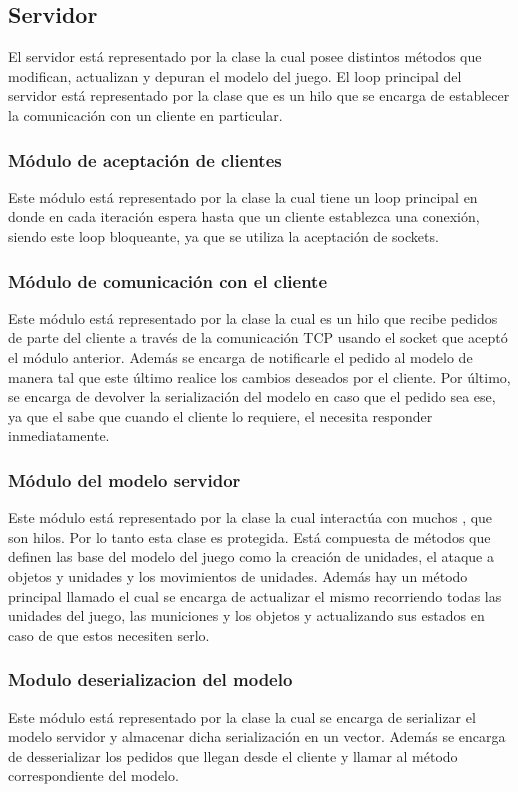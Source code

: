 \subsection{Servidor}
    El servidor está representado por la clase  la cual posee
    distintos métodos que modifican, actualizan y depuran el modelo del juego.
    El loop principal del servidor está representado por la clase
     que es un hilo que se encarga de establecer la
    comunicación con un cliente en particular.
    \subsubsection{Módulo de aceptación de clientes}
        Este módulo está representado por la clase  la cual tiene
        un loop principal en donde en cada iteración espera hasta que un cliente
        establezca una conexión, siendo este loop bloqueante, ya que se utiliza
        la aceptación de sockets.
    \subsubsection{Módulo de comunicación con el cliente}
        Este módulo está representado por la clase  la
        cual es un hilo que recibe pedidos de parte del cliente a través de la
        comunicación TCP usando el socket que aceptó el módulo anterior. Además
        se encarga de notificarle el pedido al modelo de manera tal que este
        último realice los cambios deseados por el cliente. Por último, se
        encarga de devolver la serialización del modelo en caso que el pedido
        sea ese, ya que el  sabe que cuando el cliente lo
        requiere, el  necesita responder inmediatamente.
    \subsubsection{Módulo del modelo servidor}
        Este módulo está representado por la clase  la cual
        interactúa con muchos , que son hilos. Por lo
        tanto esta clase es protegida. Está compuesta de métodos que definen las
        base del modelo del juego como la creación de unidades, el ataque a
        objetos y unidades y los movimientos de unidades. Además hay un método
        principal llamado  el cual se encarga de actualizar el
        mismo recorriendo todas las unidades del juego, las municiones y los
        objetos y actualizando sus estados en caso de que estos necesiten serlo.
    \subsubsection{Modulo deserializacion del modelo}
        Este módulo está representado por la clase  la
        cual se encarga de serializar el modelo servidor y almacenar dicha
        serialización en un vector. Además se encarga de desserializar los
        pedidos que llegan desde el cliente y llamar al método correspondiente
        del modelo.